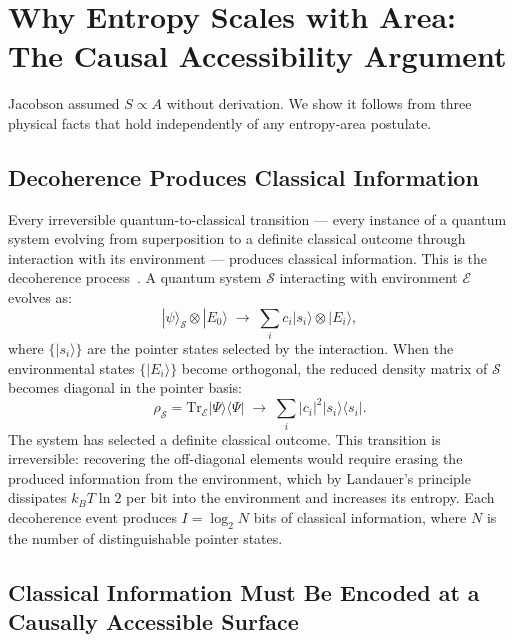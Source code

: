 \documentclass[12pt,a4paper]{article}
\begin{document}
\section{Why Entropy Scales with Area: The Causal Accessibility Argument}
\label{sec:area}

Jacobson assumed $S \propto A$ without derivation. We show it follows
from three physical facts that hold independently of any entropy-area
postulate.

\subsection{Decoherence Produces Classical Information}

Every irreversible quantum-to-classical transition --- every instance
of a quantum system evolving from superposition to a definite classical
outcome through interaction with its environment --- produces classical
information. This is the decoherence process~\citep{Zurek2003}. A
quantum system $\mathcal{S}$ interacting with environment $\mathcal{E}$
evolves as:
\begin{equation}
|\psi\rangle_\mathcal{S} \otimes |E_0\rangle
\;\longrightarrow\;
\sum_i c_i |s_i\rangle \otimes |E_i\rangle,
\label{eq:decoherence}
\end{equation}
where $\{|s_i\rangle\}$ are the pointer states selected by the
interaction. When the environmental states $\{|E_i\rangle\}$ become
orthogonal, the reduced density matrix of $\mathcal{S}$ becomes
diagonal in the pointer basis:
\begin{equation}
\rho_\mathcal{S} = \mathrm{Tr}_\mathcal{E}|\Psi\rangle\langle\Psi|
\;\longrightarrow\; \sum_i |c_i|^2 |s_i\rangle\langle s_i|.
\label{eq:diagonal}
\end{equation}
The system has selected a definite classical outcome. This
transition is irreversible: recovering the off-diagonal elements
would require erasing the produced information from the environment,
which by Landauer's principle~\citep{Landauer1961} dissipates
$k_B T \ln 2$ per bit into the environment and increases its entropy.
Each decoherence event produces $I = \log_2 N$ bits of classical
information, where $N$ is the number of distinguishable pointer
states.

\subsection{Classical Information Must Be Encoded at a Causally Accessible Surface}
\end{document}
